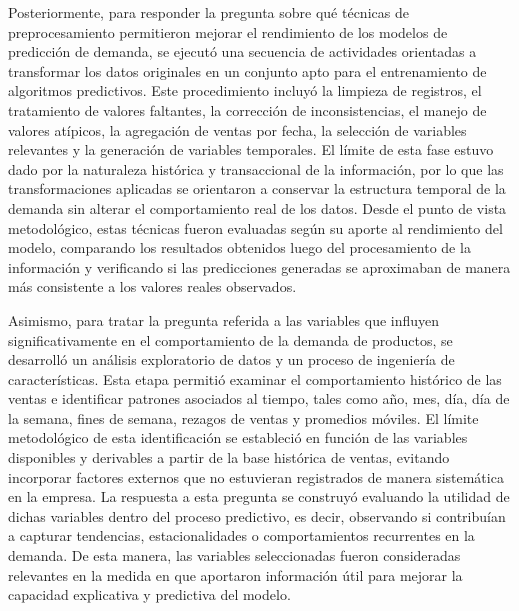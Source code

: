 Posteriormente, para responder la pregunta sobre qué técnicas de preprocesamiento permitieron mejorar el 
rendimiento de los modelos de predicción de demanda, se ejecutó una secuencia de actividades orientadas a 
transformar los datos originales en un conjunto apto para el entrenamiento de algoritmos predictivos. Este 
procedimiento incluyó la limpieza de registros, el tratamiento de valores faltantes, la corrección de 
inconsistencias, el manejo de valores atípicos, la agregación de ventas por fecha, la selección de variables 
relevantes y la generación de variables temporales. El límite de esta fase estuvo dado por la naturaleza 
histórica y transaccional de la información, por lo que las transformaciones aplicadas se orientaron a conservar 
la estructura temporal de la demanda sin alterar el comportamiento real de los datos. Desde el punto de vista 
metodológico, estas técnicas fueron evaluadas según su aporte al rendimiento del modelo, comparando los resultados
obtenidos luego del procesamiento de la información y verificando si las predicciones generadas se aproximaban 
de manera más consistente a los valores reales observados.

Asimismo, para tratar la pregunta referida a las variables que influyen significativamente en el comportamiento
de la demanda de productos, se desarrolló un análisis exploratorio de datos y un proceso de ingeniería de 
características. Esta etapa permitió examinar el comportamiento histórico de las ventas e identificar patrones 
asociados al tiempo, tales como año, mes, día, día de la semana, fines de semana, rezagos de ventas y promedios 
móviles. El límite metodológico de esta identificación se estableció en función de las variables disponibles y 
derivables a partir de la base histórica de ventas, evitando incorporar factores externos que no estuvieran 
registrados de manera sistemática en la empresa. La respuesta a esta pregunta se construyó evaluando la utilidad 
de dichas variables dentro del proceso predictivo, es decir, observando si contribuían a capturar tendencias, 
estacionalidades o comportamientos recurrentes en la demanda. De esta manera, las variables seleccionadas fueron 
consideradas relevantes en la medida en que aportaron información útil para mejorar la capacidad explicativa y 
predictiva del modelo.

